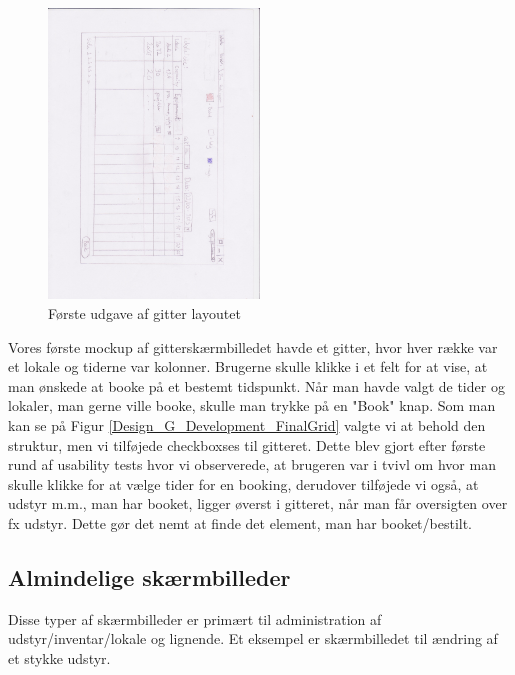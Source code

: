 \begin{figure}[h!]
  \centering
    \includegraphics[width=0.5\textwidth, angle=90]{Appendix/GUI-Prototype/PaperMockup/LokaleListe_001}
  \caption{Første udgave af gitter layoutet}
\label{Design_G_Development_FirstGrid}
\end{figure}

Vores første mockup af gitterskærmbilledet havde et gitter, hvor hver række var et lokale og tiderne var kolonner. Brugerne skulle klikke i et felt for at vise, at man ønskede at booke på et bestemt tidspunkt. Når man havde valgt de tider og lokaler, man gerne ville booke, skulle man trykke på en "Book" knap. Som man kan se på Figur \ref{Design_G_Development_FinalGrid} valgte vi at behold den struktur, men vi tilføjede checkboxses til gitteret. Dette blev gjort efter første rund af usability tests hvor vi observerede, at brugeren var i tvivl om hvor man skulle klikke for at vælge tider for en booking, derudover tilføjede vi også, at udstyr m.m., man har booket, ligger øverst i gitteret, når man får oversigten over fx udstyr. Dette gør det nemt at finde det element, man har booket/bestilt.


\subsection{Almindelige skærmbilleder}
\label{Design_G_Development_NormalWindows}
Disse typer af skærmbilleder er primært til administration af udstyr/inventar/lokale og lignende. Et eksempel er skærmbilledet til ændring af et stykke udstyr. 

